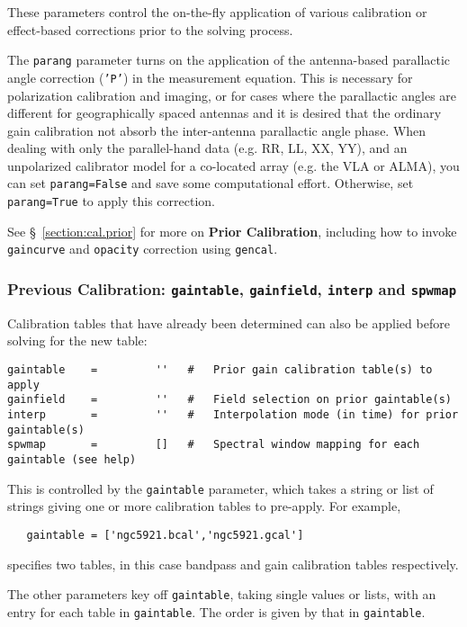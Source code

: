 These parameters control the on-the-fly application of various
calibration or effect-based corrections prior to the solving process.

The {\tt parang} parameter turns on the application of the
antenna-based parallactic angle correction ({\tt 'P'}) in the
measurement equation.  This is necessary for polarization calibration
and imaging, or for cases where the parallactic angles are different
for geographically spaced antennas and it is desired that the ordinary
gain calibration not absorb the inter-antenna parallactic angle phase.  
When dealing with only the parallel-hand data (e.g. RR, LL, XX, YY),
and an unpolarized calibrator model
for a co-located array (e.g. the VLA or ALMA), you can set {\tt  parang=False} 
and save some computational effort.  Otherwise, set {\tt parang=True} to apply
this correction.

See \S~\ref{section:cal.prior} for more on {\bf Prior Calibration},
including
how to invoke {\tt gaincurve} and {\tt opacity} correction using
{\tt gencal}.

\subsubsection{Previous Calibration: {\tt gaintable},
{\tt gainfield}, {\tt interp} and {\tt spwmap} }
\label{section:cal.solve.pars.previous}

Calibration tables that have already been determined can also be
applied before solving for the new table:
\small
\begin{verbatim}
gaintable    =         ''   #   Prior gain calibration table(s) to apply
gainfield    =         ''   #   Field selection on prior gaintable(s)
interp       =         ''   #   Interpolation mode (in time) for prior gaintable(s)
spwmap       =         []   #   Spectral window mapping for each gaintable (see help)
\end{verbatim}
\normalsize

This is controlled by the {\tt gaintable} parameter, which takes 
a string or list of strings giving one or more calibration tables 
to pre-apply.  For example,

\small
\begin{verbatim}
   gaintable = ['ngc5921.bcal','ngc5921.gcal']
\end{verbatim}
\normalsize
specifies two tables, in this case bandpass and gain calibration tables
respectively.

The other parameters key off {\tt gaintable}, taking single values or
lists, with an entry for each table in {\tt gaintable}.  The order is
given by that in {\tt gaintable}.

